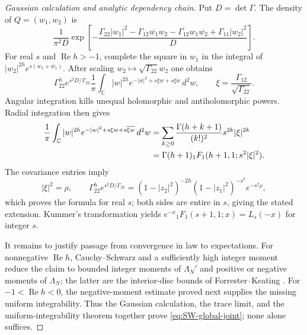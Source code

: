 \begin{proof}[Gaussian calculation and analytic dependency chain]
Put $D=\det\Gamma$.  The density of $Q=(w_1,w_2)$ is
\begin{equation}
 \frac1{\pi^2D}\exp\!\left[-\frac{
 \Gamma_{22}|w_1|^2-\Gamma_{12}\overline{w_1}w_2
 -\overline{\Gamma_{12}}w_1\overline{w_2}+\Gamma_{11}|w_2|^2}{D}\right].
 \label{eq:SW-joint-density}
\end{equation}
For real $s$ and $\operatorname{Re}h>-1$, complete the square in $w_1$ in the integral of
$|w_2|^{2h}e^{s(w_1+\overline{w_1})}$.  After scaling
$w_2\mapsto\sqrt{\Gamma_{22}}w_2$ one obtains
\begin{equation}
 \Gamma_{22}^{h}e^{s^2D/\Gamma_{22}}
 \frac1\pi\int_{\mathbb C}|w|^{2h}e^{-|w|^2+s\xi w+s\overline{\xi w}}\,d^2w,
 \qquad \xi=\frac{\Gamma_{12}}{\sqrt{\Gamma_{22}}}.
 \label{eq:SW-square-completed}
\end{equation}
Angular integration kills unequal holomorphic and antiholomorphic powers.  Radial integration
then gives
\begin{align}
 \frac1\pi\int_{\mathbb C}|w|^{2h}e^{-|w|^2+s\xi w+s\overline{\xi w}}\,d^2w
 &=\sum_{k\geq0}\frac{\Gamma(h+k+1)}{(k!)^2}s^{2k}|\xi|^{2k}\notag\\
 &=\Gamma(h+1){}_1F_1(h+1,1;s^2|\xi|^2).
 \label{eq:SW-hypergeometric-integral}
\end{align}
The covariance entries imply
\begin{equation}
 |\xi|^2=\rho,\qquad
 \Gamma_{22}^{h}e^{s^2D/\Gamma_{22}}
 =(1-|z_2|^2)^{-2h}(1-|z_1|^2)^{-s^2}e^{-s^2\rho},
 \label{eq:SW-covariance-substitution}
\end{equation}
which proves the formula for real $s$; both sides are entire in $s$, giving the stated
extension.  Kummer's transformation yields
$e^{-x}{}_1F_1(s+1,1;x)=L_s(-x)$ for integer $s$.

It remains to justify passage from convergence in law to expectations.  For nonnegative
$\operatorname{Re}h$, Cauchy--Schwarz and a sufficiently high integer moment reduce the
claim to bounded integer moments of $\Lambda_N'$ and positive or negative moments of
$\Lambda_N$; the latter are the interior-disc bounds of Forrester--Keating
\cite[Cor.~2]{forresterKeating2004}.  For $-1<\operatorname{Re}h<0$, the negative-moment
estimate proved next supplies the missing uniform integrability.  Thus the Gaussian
calculation, the trace limit, and the uniform-integrability theorem together prove
\eqref{eq:SW-global-joint}; none alone suffices.
\end{proof}

